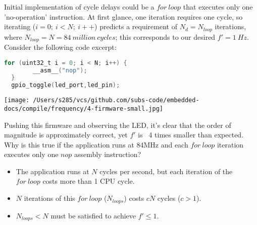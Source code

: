 \documentclass[a4paper,12pt]{article}   	%
\begin{document}
\large
\begin{flushleft}
Initial implementation of cycle delays could be a 
$for\ loop$ that executes only one 'no-operation' instruction. At first 
glance, one iteration requires one cycle, so iterating ($i = 0;\ i < N;\ i++$)
predicts a requirement of $N_d = N_{loop}$ iterations, where $N_{loop} = N = 84\ million\ cycles$;
this corresponds to our desired $f'= 1\ Hz$.
Consider the following code excerpt:\\[1 ex] 

\begin{lstlisting}[backgroundcolor = \color{beige},
                    language = C,
                    xleftmargin = 2cm,
                    framexleftmargin = 1em]
  for (uint32_t i = 0; i < N; i++) {
        __asm__("nop");
  }
  gpio_toggle(led_port,led_pin);
  \end{lstlisting}
  
\begin{center}
    \texttt{[image: /Users/s285/vcs/github.com/subs-code/embedded-docs/compile/frequency/4-firmware-small.jpg]}
\end{center}

Pushing this firmware and
observing the LED, it's clear that the order of magnitude is approximately correct, 
yet $f'$ is ~4 times smaller than expected. Why is this true 
if the application runs at 84MHz and each $for\ loop$ iteration executes only one $nop$ assembly instruction?\\[1 ex]

\end{flushleft}
\begin{itemize}
\setlength{\itemindent}{0.4in}
    \item The application runs at $N$ cycles per second, 
    but each iteration of the $for\ loop$ costs more than 1 CPU cycle. 
    \item $N$ iterations of this $for\ loop$ ($N_{loops}$) costs $cN$ cycles ($c > 1$).
    \item $N_{loops} < N$ must be satisfied to achieve $f' \le 1.$
\end{itemize}
\end{document}
